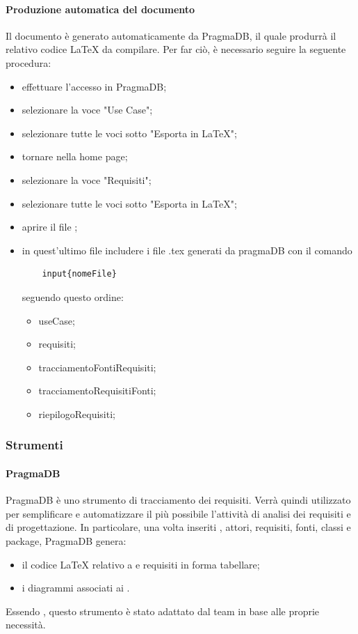 \paragraph{Produzione automatica del documento \ARdoc}
Il documento \ARdoc{} è generato automaticamente da PragmaDB, il quale produrrà il relativo codice \LaTeX{} da compilare.
Per far ciò, è necessario seguire la seguente procedura:
\begin{itemize}
	\item effettuare l'accesso in PragmaDB;
	\item selezionare la voce "Use Case";
	\item selezionare tutte le voci sotto "Esporta in \LaTeX";
	\item tornare nella home page;
	\item selezionare la voce "Requisiti";
	\item selezionare tutte le voci sotto "Esporta in \LaTeX";
	\item aprire il file \ARfile;
	\item in quest'ultimo file includere i file .tex generati da pragmaDB con il comando \begin{verbatim}
	input{nomeFile}
	\end{verbatim}
	seguendo questo ordine: 
	\begin{itemize}
		\item useCase;
		\item requisiti;
		\item tracciamentoFontiRequisiti;
		\item tracciamentoRequisitiFonti;
		\item riepilogoRequisiti;
	\end{itemize}
\end{itemize}

\subsubsection{Strumenti}
 \paragraph{PragmaDB} 
  PragmaDB è uno strumento  di tracciamento dei requisiti. Verrà quindi utilizzato per semplificare e automatizzare il più possibile l'attività di analisi dei requisiti e di progettazione. In particolare, una volta inseriti , attori, requisiti, fonti, classi e package, PragmaDB genera: 
  \begin{itemize}
  \item il codice \LaTeX{} relativo a  e requisiti in forma tabellare;
  \item i diagrammi  associati ai .
  
  \end{itemize}
  Essendo , questo strumento è stato adattato dal team \GRUPPO{} in base alle proprie necessità.
